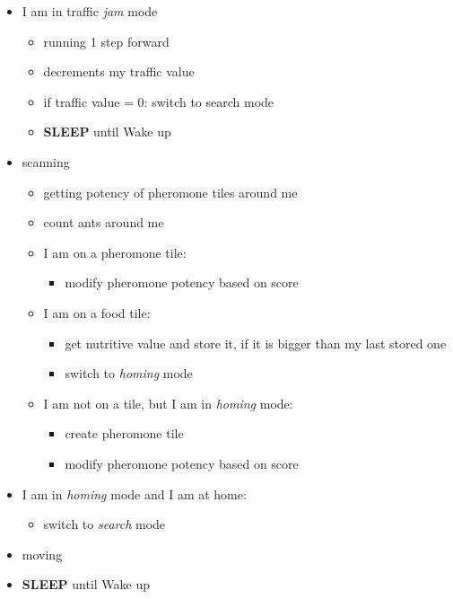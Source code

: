 \begin{itemize}
\tightlist
\item
  I am in traffic \emph{jam} mode

  \begin{itemize}
  \tightlist
  \item
    running 1 step forward
  \item
    decrements my traffic value
  \item
    if traffic value = 0: switch to search mode
  \item
    \textbf{SLEEP} until Wake up
  \end{itemize}
\item
  scanning

  \begin{itemize}
  \tightlist
  \item
    getting potency of pheromone tiles around me
  \item
    count ants around me
  \item
    I am on a pheromone tile:

    \begin{itemize}
    \tightlist
    \item
      modify pheromone potency based on score
    \end{itemize}
  \item
    I am on a food tile:

    \begin{itemize}
    \tightlist
    \item
      get nutritive value and store it, if it is bigger than my last
      stored one
    \item
      switch to \emph{homing} mode
    \end{itemize}
  \item
    I am not on a tile, but I am in \emph{homing} mode:

    \begin{itemize}
    \tightlist
    \item
      create pheromone tile
    \item
      modify pheromone potency based on score
    \end{itemize}
  \end{itemize}
\item
  I am in \emph{homing} mode and I am at home:

  \begin{itemize}
  \tightlist
  \item
    switch to \emph{search} mode
  \end{itemize}
\item
  moving
\item
  \textbf{SLEEP} until Wake up
\end{itemize}

